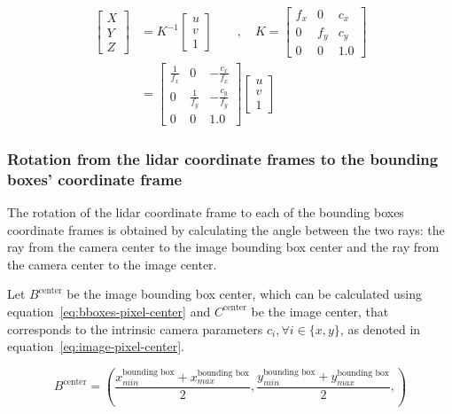 \begin{align}
	\label{eq:back-projection}
	\begin{bmatrix}
		X \\
		Y \\
		Z
	\end{bmatrix}
	 & = K^{-1} 
	\begin{bmatrix}
		u \\
		v \\
		1
	\end{bmatrix}
\qquad , \quad
	K = 
	\begin{bmatrix}
		f_x & 0 & c_x \\
		0 & f_y & c_y \\
		0 & 0 & 1.0
	\end{bmatrix}
\nonumber \\	 
	&  = 
	\begin{bmatrix}
	\frac{1}{f_x} & 0 & -\frac{c_x}{f_x} \\
	0 & \frac{1}{f_y}  & -\frac{c_y}{f_y} \\
	0 & 0 & 1.0 
	\end{bmatrix}
	\begin{bmatrix}
		u \\
		v \\
		1
	\end{bmatrix}
\end{align}

\subsubsection{Rotation from the \ac{lidar} coordinate frames to the bounding boxes' coordinate frame}
The rotation of the \ac{lidar} coordinate frame to each of the bounding boxes coordinate frames is obtained by calculating the angle between the two rays: the ray from the camera center to the image bounding box center and the ray from the camera center to the image center. 

Let $B^\text{center}$ be the image bounding box center, which can be calculated using equation~\eqref{eq:bboxes-pixel-center} and $C^\text{center}$ be the image center, that corresponds to the intrinsic camera parameters $c_i, \forall i \in \{x, y\}$, as denoted in equation~\eqref{eq:image-pixel-center}.

\begin{equation}
	\label{eq:bboxes-pixel-center}	
B^\text{center} = \left(\frac{x^{\text{bounding box}}_{min} + x^{\text{bounding box}}_{max}}{2}, \frac{y^{\text{bounding box}}_{min} + y^{\text{bounding box}}_{max}}{2},\right)
\end{equation}

